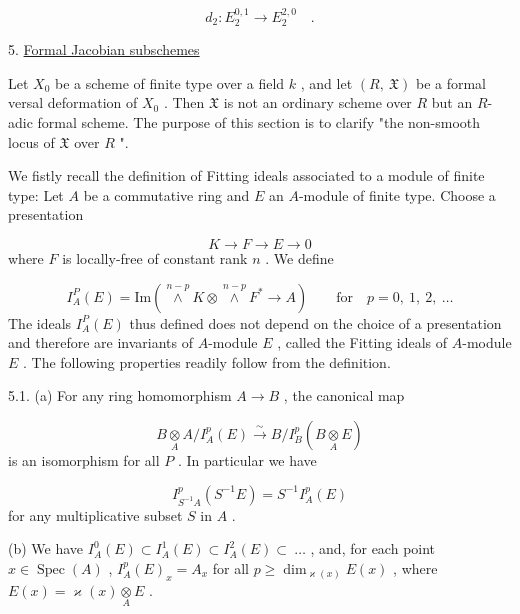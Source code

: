 \begin{equation*}
d_2 : E_2^{0,1} \to E_2^{2,0} \quad .
\end{equation*}

5.  \underline{Formal Jacobian subschemes}

Let  $X_0$  be a scheme of finite type over a field  $k$ , and let  $(R,\ \mathfrak{X})$  be a formal versal deformation of  $X_0$ . Then  $\mathfrak{X}$  is not an ordinary scheme over  $R$  but an $R$-adic formal scheme. The purpose of this section is to clarify  "the non-smooth locus of  $\mathfrak{X}$  over  $R$ ".

We fistly recall the definition of Fitting ideals associated to a module of finite type: Let  $A$  be a commutative ring and  $E$  an $A$-module of finite type. Choose a presentation

\begin{equation*}
K \to F \to E \to 0
\end{equation*}
where  $F$  is locally-free of constant rank  $n$ . We define

\begin{equation*}
I^P_A(E) = \mathrm{Im}(\overset{n-p}{\wedge} K \otimes \overset{n-p}{\wedge} F^* \to A) \qquad \text{for}\quad p = 0,\ 1,\ 2,\ \ldots
\end{equation*}
The ideals  $I^P_A(E)$  thus defined does not depend on the choice of a presentation and therefore are invariants of $A$-module  $E$ , called the Fitting ideals of $A$-module  $E$ . The following properties readily follow from the definition.

5.1.    (a) For any ring homomorphism  $A \to B$ , the canonical map

\begin{equation*}
B \underset{A}{\otimes} A/I^p_A(E) \overset{\sim}{\to} B/I^p_B(B \underset{A}{\otimes} E)
\end{equation*}
is an isomorphism for all  $P$ . In particular we have

\begin{equation*}
I^p_{S^{-1}A}(S^{-1}E) = S^{-1}I^p_A(E)
\end{equation*}
for any multiplicative subset  $S$  in  $A$ .



(b)  We have  $I_A^0(E) \subset I_A^1(E) \subset I_A^2(E) \subset \ \dots$ , and, for each point $x \in \operatorname{Spec}(A)$ , $I_A^p(E)_x = A_x$  for all  $p \geq \dim_{\varkappa(x)} E(x)$ , where  $E(x) = \varkappa(x) \underset{A}{\otimes} E$ .

